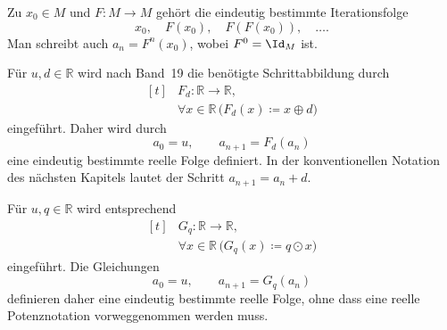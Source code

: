 \documentclass[main.tex]{subfiles}
\providecommand{\RealAdd}{\mathbin{\oplus}}
\providecommand{\RealMul}{\mathbin{\odot}}
\begin{document}
\begin{tabproofsplitwide}
  \closeproofpartwide
\end{tabproofsplitwide}

\begin{example}[Iteration]
Zu \(x_0\in M\) und \(F\colon M\to M\) gehört die eindeutig bestimmte
Iterationsfolge
\[
  x_0,\quad F(x_0),\quad F(F(x_0)),\quad\ldots.
\]
Man schreibt auch \(a_n=F^n(x_0)\), wobei \(F^0=\Id_M\) ist.
\end{example}

\begin{example}
Für \(u,d\in\mathbb R\) wird nach Band~19 die benötigte Schrittabbildung
durch
\[
  \begin{aligned}[t]
    &F_d\colon\mathbb R\to\mathbb R,\\[-2pt]
    &\forall x\in\mathbb R\,
      \bigl(F_d(x)\coloneqq x\RealAdd d\bigr)
  \end{aligned}
\]
eingeführt. Daher wird durch
\[
  a_0=u,
  \qquad a_{n+1}=F_d(a_n)
\]
eine eindeutig bestimmte reelle Folge definiert. In der konventionellen
Notation des nächsten Kapitels lautet der Schritt \(a_{n+1}=a_n+d\).
\end{example}

\begin{example}
Für \(u,q\in\mathbb R\) wird entsprechend
\[
  \begin{aligned}[t]
    &G_q\colon\mathbb R\to\mathbb R,\\[-2pt]
    &\forall x\in\mathbb R\,
      \bigl(G_q(x)\coloneqq q\RealMul x\bigr)
  \end{aligned}
\]
eingeführt. Die Gleichungen
\[
  a_0=u,
  \qquad a_{n+1}=G_q(a_n)
\]
definieren daher eine eindeutig bestimmte reelle Folge, ohne dass eine
reelle Potenznotation vorweggenommen werden muss.
\end{example}
\end{document}
